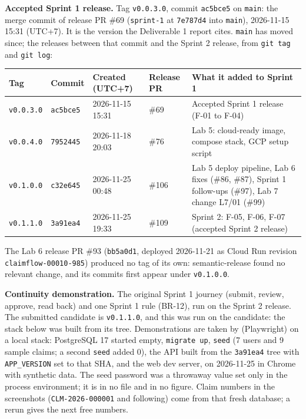 \label{A:1}

\textbf{Accepted Sprint 1 release.} Tag \texttt{v0.0.3.0}, commit \texttt{ac5bce5} on \texttt{main}: the merge commit of release PR \#69 (\texttt{sprint-1} at \texttt{7e787d4} into \texttt{main}), 2026-11-15 15:31 (UTC+7). It is the version the Deliverable 1 report cites. \texttt{main} has moved since; the releases between that commit and the Sprint 2 release, from \texttt{git tag} and \texttt{git log}:

\begin{center}\small
\begin{tabular}{@{}llllp{7.6cm}@{}}
\toprule \textbf{Tag} & \textbf{Commit} & \textbf{Created (UTC+7)} & \textbf{Release PR} & \textbf{What it added to Sprint 1} \\ \midrule
\texttt{v0.0.3.0} & \texttt{ac5bce5} & 2026-11-15 15:31 & \#69 & Accepted Sprint 1 release (F-01 to F-04) \\
\texttt{v0.0.4.0} & \texttt{7952445} & 2026-11-18 20:03 & \#76 & Lab 5: cloud-ready image, compose stack, GCP setup script \\
\texttt{v0.1.0.0} & \texttt{c32e645} & 2026-11-25 00:48 & \#106 & Lab 5 deploy pipeline, Lab 6 fixes (\#86, \#87), Sprint 1 follow-ups (\#97), Lab 7 change L7/01 (\#99) \\
\texttt{v0.1.1.0} & \texttt{3a91ea4} & 2026-11-25 19:33 & \#109 & Sprint 2: F-05, F-06, F-07 (accepted Sprint 2 release) \\
\bottomrule
\end{tabular}
\end{center}

\noindent The Lab 6 release PR \#93 (\texttt{bb5a0d1}, deployed 2026-11-21 as Cloud Run revision \texttt{claimflow-00010-985}) produced no tag of its own: semantic-release found no relevant change, and its commits first appear under \texttt{v0.1.0.0}.

\textbf{Continuity demonstration.} The original Sprint 1 journey (submit, review, approve, read back) and one Sprint 1 rule (BR-12), run on the Sprint 2 release. The submitted candidate is \texttt{v0.1.1.0}, and this was run on the candidate: the stack below was built from its tree. Demonstrations are taken by  (Playwright) on a local stack: PostgreSQL 17 started empty, \texttt{migrate up}, \texttt{seed} (7 users and 9 sample claims; a second \texttt{seed} added 0), the API built from the \texttt{3a91ea4} tree with \texttt{APP\_VERSION} set to that SHA, and the web dev server, on 2026-11-25 in Chrome with synthetic data. The seed password was a throwaway value set only in the process environment; it is in no file and in no figure. Claim numbers in the screenshots (\texttt{CLM-2026-000001} and following) come from that fresh database; a rerun gives the next free numbers.

